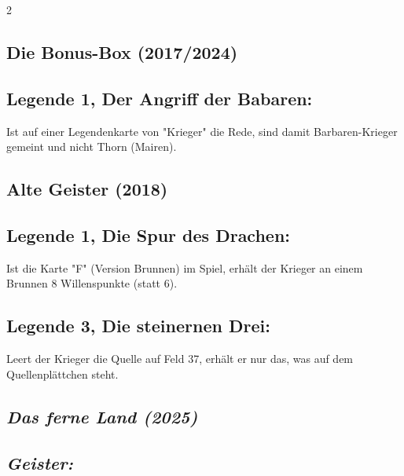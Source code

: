 \documentclass[10pt, a4paper, oneside]{book}
\newcommand{\fan}[1]{\textit{#1}}
\begin{document}
\begin{multicols*}{2}
\begin{bgcolor}[color-bb]
\section{Die Bonus-Box (2017/2024)}

\subsection{Legende 1, Der Angriff der Babaren:}

Ist auf einer Legendenkarte von "Krieger" die Rede, sind damit Barbaren-Krieger gemeint und nicht Thorn (Mairen).
\supercite{bb1-a}

\end{bgcolor}





\begin{bgcolor}[color-ag]
\section{Alte Geister (2018)}



\subsection{Legende 1, Die Spur des Drachen:}

Ist die Karte "F" (Version Brunnen) im Spiel, erhält der Krieger an einem Brunnen 8 Willenspunkte (statt 6).
\supercite{ag1-f-brunnen}


\subsection{Legende 3, Die steinernen Drei:}

Leert der Krieger die Quelle auf Feld 37, erhält er nur das, was auf dem Quellenplättchen steht.
\supercite{ag-begleitheft}

\end{bgcolor}






\begin{bgcolor}
\section{\fan{Das ferne Land (2025)}}

\subsection{\fan{Geister:}}


\end{bgcolor}
\end{multicols*}
\end{document}
